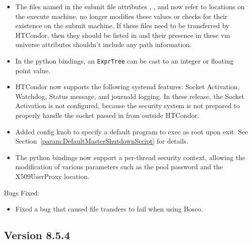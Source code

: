 \begin{itemize}
\item The files named in the submit file attributes ,
, and  now refer to
locations on the execute machine.
 no longer modifies these values or checks for their
existence on the submit machine.
If these files need to be transferred by HTCondor, then they should be
listed in  and their presence in
these vm universe attributes shouldn't include any path information.

\item In the python bindings, an \texttt{ExprTree} can be cast to an integer
or floating point value.

\item HTCondor now supports the following systemd features: Socket Activation,
Watchdog, Status message, and journald logging. In these release, the
Socket Activation is not configured, because the security system is not
prepared to properly handle the socket passed in from outside HTCondor.

\item Added config knob  to
specify a default program to exec as root upon  exit.
See Section~\ref{param:DefaultMasterShutdownScript} for details.

\item The python bindings now support a per-thread security context,
allowing the modification of various parameters such as the pool password
and the X509UserProxy location.

\end{itemize}

\noindent Bugs Fixed:

\begin{itemize}

\item Fixed a bug that caused file transfers to fail when using Bosco.

\end{itemize}

\subsection*{\label{sec:New-8-5-4}Version 8.5.4}

